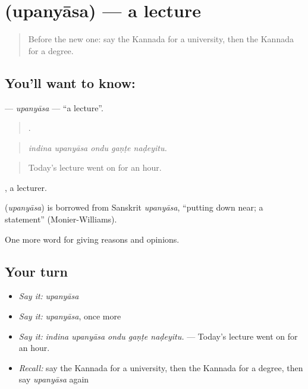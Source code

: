 \section[\texorpdfstring{\kn{ಉಪನ್ಯಾಸ} (upanyāsa)}{ಉಪನ್ಯಾಸ (upanyāsa)}]{ (upanyāsa) — a lecture}

\label{lesson:KA-C406-upanyasa}



\begin{quote}
Before the new one: say the Kannada for a university, then the Kannada for a degree.
\end{quote}

\subsection*{You'll want to know: }
\textbf{} — \emph{upanyāsa} — \textquotedblleft{}a lecture\textquotedblright{}.

\begin{quote}
    .
\end{quote}

\begin{quote}
\emph{indina upanyāsa ondu gaṇṭe naḍeyitu.}
\end{quote}

\begin{quote}
Today's lecture went on for an hour.
\end{quote}

, a lecturer.

\begin{cousinweb}
\textbf{} (\emph{upanyāsa}) is borrowed from Sanskrit \emph{upanyāsa}, \textquotedblleft{}putting down near; a statement\textquotedblright{} (Monier-Williams).
\end{cousinweb}

\begin{grammarlens}[title={What you've built}]
One more word for giving reasons and opinions.
\end{grammarlens}

\subsection*{Your turn}
\begin{itemize}
\raggedright
  \item \emph{Say it:} \emph{upanyāsa}
  \item \emph{Say it:} \emph{upanyāsa}, once more
  \item \emph{Say it:} \emph{indina upanyāsa ondu gaṇṭe naḍeyitu.} — Today's lecture went on for an hour.
  \item \emph{Recall:} say the Kannada for a university, then the Kannada for a degree, then say \emph{upanyāsa} again
\end{itemize}

